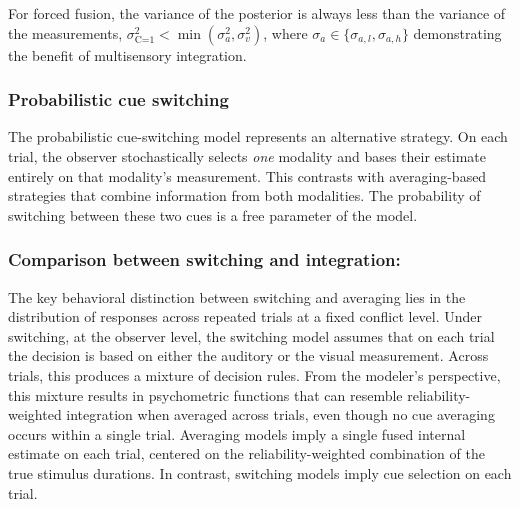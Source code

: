 \documentclass[9pt,lineno,doublespacing]{elife}
\begin{document}
For forced fusion, the variance of the posterior is always less than the variance of the measurements, $\sigma_{\text{C=1}}^2 < \min(\sigma_a^2, \sigma_v^2)$, where $\sigma_a \in \{\sigma_{a,l}, \sigma_{a,h}\}$ demonstrating the benefit of multisensory integration.

\subsubsection{Probabilistic cue switching}

The probabilistic cue-switching model represents an alternative strategy. On each trial, the observer stochastically selects \textit{one} modality and bases their estimate entirely on that modality's measurement. This contrasts with averaging-based strategies that combine information from both modalities. The probability of switching between these two cues is a free  parameter of the model. 





\subsubsection{Comparison between switching and integration:}
The key behavioral distinction between switching and averaging lies in the distribution of responses across repeated trials at a fixed conflict level. Under switching, at the observer level, the switching model assumes that on each trial the decision is based on either the auditory or the visual measurement. Across trials, this produces a mixture of decision rules. From the modeler’s perspective, this mixture results in psychometric functions that can resemble reliability-weighted integration when averaged across trials, even though no cue averaging occurs within a single trial. Averaging models imply a single fused internal estimate on each trial, centered on the reliability-weighted combination of the true stimulus durations. In contrast, switching models imply cue selection on each trial.
\end{document}
